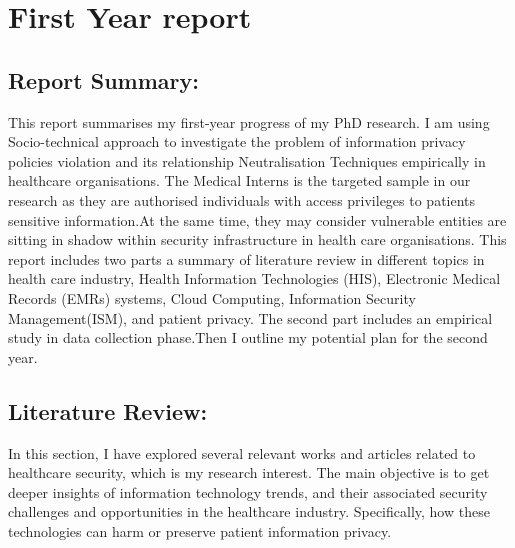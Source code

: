 

\chapter{First Year report}

\section{Report Summary:}
This report summarises my first-year progress of my PhD research. I am using Socio-technical approach to investigate the problem of information privacy policies violation and its relationship Neutralisation Techniques empirically in healthcare organisations. The Medical Interns is the targeted sample in our research as they are authorised individuals with access privileges to patients sensitive information.At the same time, they may consider vulnerable entities are sitting in shadow within security infrastructure in health care organisations. This report includes two parts a summary of literature review in different topics in health care industry, Health Information Technologies (HIS), Electronic Medical Records (EMRs) systems, Cloud Computing, Information Security Management(ISM), and patient privacy. The second part includes an empirical study in data collection phase.Then I outline my potential plan for the second year.



\section{Literature Review:}
In this section, I have explored several relevant works and articles related to healthcare security, which is my research interest. The main objective is to get deeper insights of information technology trends, and their associated security challenges and opportunities in the healthcare industry. Specifically, how these technologies can harm or preserve patient information privacy.
